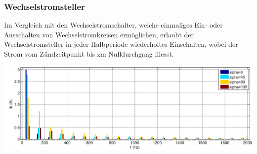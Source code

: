 \subsubsection{Wechselstromsteller}
\begin{minipage}{0.5\linewidth}
    Im Vergleich mit den Wechselstromschalter, welche einmaliges Ein- oder Ausschalten von Wechselstromkreisen ermöglichen, erlaubt der Wechselstromsteller in jeder Halbperiode wiederholtes Einschalten, wobei der Strom vom Zündzeitpunkt bis zm Nulldurchgang fliesst.
\end{minipage}
\begin{minipage}{0.5\linewidth}
    \includegraphics[width=\linewidth]{images/OWWSSteller}
\end{minipage}

